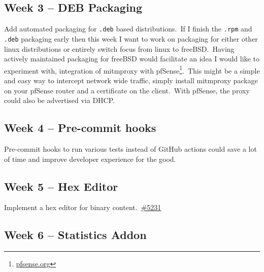 
\subsection{Week 3 -- DEB Packaging}
\label{subsec:week-3}

Add automated packaging for \texttt{.deb} based distributions.\ If I finish the \texttt{.rpm} and \texttt{.deb}
packaging early then this week I want to work on packaging for either other linux distributions or entirely
switch focus from linux to freeBSD.\ Having actively maintained packaging for freeBSD would facilitate an idea I
would like to experiment with, integration of mitmproxy with
pfSense\footnote{\href{https://www.pfsense.org}{pfsense.org}}.\ This might be a simple and easy way to intercept
network wide traffic, simply install mitmproxy package on your pfSense router and a certificate on the client.\
With pfSense, the proxy could also be advertised via DHCP.\


\subsection{Week 4 -- Pre-commit hooks}
\label{subsec:week-4}

Pre-commit hooks to run various tests instead of GitHub actions could save a lot of time and improve developer
experience for the good.


\subsection{Week 5 -- Hex Editor}
\label{subsec:week-5}

Implement a hex editor for binary content.\ \href{https://github.com/mitmproxy/mitmproxy/issues/5231}{\#5231}


\subsection{Week 6 -- Statistics Addon}
\label{subsec:week-6}

